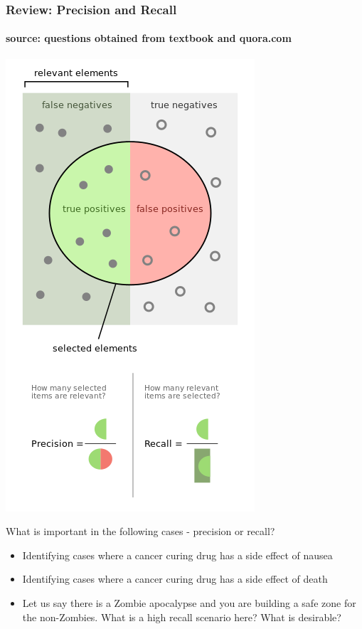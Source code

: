 \documentclass{beamer}
\begin{document}
\begin{frame}
\frametitle{Review: Precision and Recall}
\framesubtitle{source: questions obtained from textbook and quora.com}
\begin{minipage}{0.3\textwidth}
\includegraphics[width=\linewidth]{Precisionrecall.png}
\end{minipage}%
\begin{minipage}{0.6\textwidth}
What is important in the following cases - precision or recall?
\begin{itemize}
\item Identifying cases where a cancer curing drug has a side effect of nausea \pause
\item Identifying cases where a cancer curing drug has a side effect of death \pause
\item Let us say there is a Zombie apocalypse and you are building a safe zone for the non-Zombies. What is a high recall scenario here? What is desirable?
\end{itemize}
\end{minipage} \bigskip
\end{frame}
\end{document}
